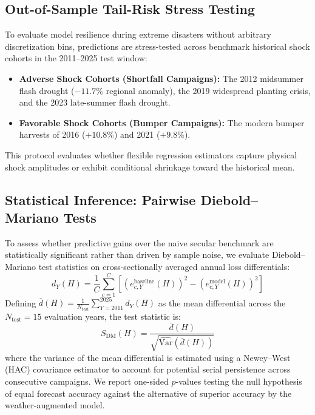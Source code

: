 \subsection{Out-of-Sample Tail-Risk Stress Testing}
\label{sec:meth_tail_risk}

To evaluate model resilience during extreme disasters without arbitrary discretization bins, predictions are stress-tested across benchmark historical shock cohorts in the 2011--2025 test window:
\begin{itemize}
    \item \textbf{Adverse Shock Cohorts (Shortfall Campaigns):} The 2012 midsummer flash drought ($-11.7\%$ regional anomaly), the 2019 widespread planting crisis, and the 2023 late-summer flash drought.
    \item \textbf{Favorable Shock Cohorts (Bumper Campaigns):} The modern bumper harvests of 2016 ($+10.8\%$) and 2021 ($+9.8\%$).
\end{itemize}
This protocol evaluates whether flexible regression estimators capture physical shock amplitudes or exhibit conditional shrinkage toward the historical mean.

\subsection{Statistical Inference: Pairwise Diebold--Mariano Tests}
\label{sec:meth_significance_bootstrap}

To assess whether predictive gains over the naive secular benchmark are statistically significant rather than driven by sample noise, we evaluate Diebold--Mariano test statistics on cross-sectionally averaged annual loss differentials:
\begin{equation}
    d_Y(H) = \frac{1}{C} \sum_{c=1}^C \left[ \left(e_{c,Y}^{\text{baseline}}(H)\right)^2 - \left(e_{c,Y}^{\text{model}}(H)\right)^2 \right]
    \label{eq:dm_differential}
\end{equation}
Defining $\bar{d}(H) = \frac{1}{N_{\text{test}}} \sum_{Y=2011}^{2025} d_Y(H)$ as the mean differential across the $N_{\text{test}} = 15$ evaluation years, the test statistic is:
\begin{equation}
    S_{\text{DM}}(H) = \frac{\bar{d}(H)}{\sqrt{\widehat{\text{Var}}(\bar{d}(H))}}
    \label{eq:dm_statistic}
\end{equation}
where the variance of the mean differential is estimated using a Newey--West (HAC) covariance estimator to account for potential serial persistence across consecutive campaigns. We report one-sided $p$-values testing the null hypothesis of equal forecast accuracy against the alternative of superior accuracy by the weather-augmented model.

